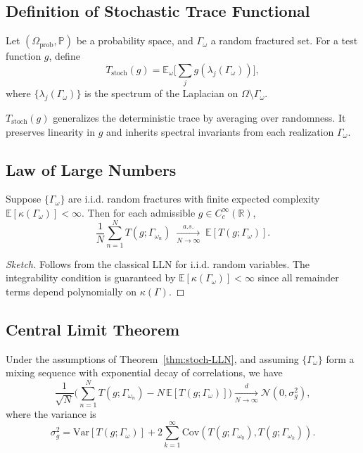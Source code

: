 \subsection{Definition of Stochastic Trace Functional}

\begin{definition}
Let $(\Omega_{\mathrm{prob}},\mathbb{P})$ be a probability space, and $\Gamma_\omega$ a random fractured set. 
For a test function $g$, define
\[
T_{\mathrm{stoch}}(g) 
= \mathbb{E}_\omega \Big[ \sum_{j} g(\lambda_j(\Gamma_\omega)) \Big],
\]
where $\{\lambda_j(\Gamma_\omega)\}$ is the spectrum of the Laplacian on $\Omega\setminus\Gamma_\omega$.
\end{definition}

\begin{remark}
$T_{\mathrm{stoch}}(g)$ generalizes the deterministic trace by averaging over randomness. 
It preserves linearity in $g$ and inherits spectral invariants from each realization $\Gamma_\omega$. 
\end{remark}

\subsection{Law of Large Numbers}

\begin{theorem}
\label{thm:stoch-LLN}
Suppose $\{\Gamma_\omega\}$ are i.i.d. random fractures with finite expected complexity $\mathbb{E}[\kappa(\Gamma_\omega)]<\infty$. 
Then for each admissible $g\in C_c^\infty(\mathbb{R})$,
\[
\frac{1}{N}\sum_{n=1}^N T(g;\Gamma_{\omega_n}) 
\;\xrightarrow[N\to\infty]{a.s.}\;
\mathbb{E}[T(g;\Gamma_\omega)].
\]
\end{theorem}

\begin{proof}[Sketch]
Follows from the classical LLN for i.i.d. random variables. 
The integrability condition is guaranteed by $\mathbb{E}[\kappa(\Gamma_\omega)]<\infty$ since all remainder terms depend polynomially on $\kappa(\Gamma)$. 
\end{proof}

\subsection{Central Limit Theorem}

\begin{theorem}
\label{thm:stoch-CLT}
Under the assumptions of Theorem~\ref{thm:stoch-LLN}, and assuming $\{\Gamma_\omega\}$ form a mixing sequence with exponential decay of correlations, we have
\[
\frac{1}{\sqrt{N}}\Big( \sum_{n=1}^N T(g;\Gamma_{\omega_n}) - N\,\mathbb{E}[T(g;\Gamma_\omega)] \Big)
\xrightarrow[N\to\infty]{d}
\mathcal{N}(0,\sigma_g^2),
\]
where the variance is
\[
\sigma_g^2 
= \mathrm{Var}[T(g;\Gamma_\omega)] + 2\sum_{k=1}^\infty \mathrm{Cov}(T(g;\Gamma_{\omega_0}),T(g;\Gamma_{\omega_k})).
\]
\end{theorem}

